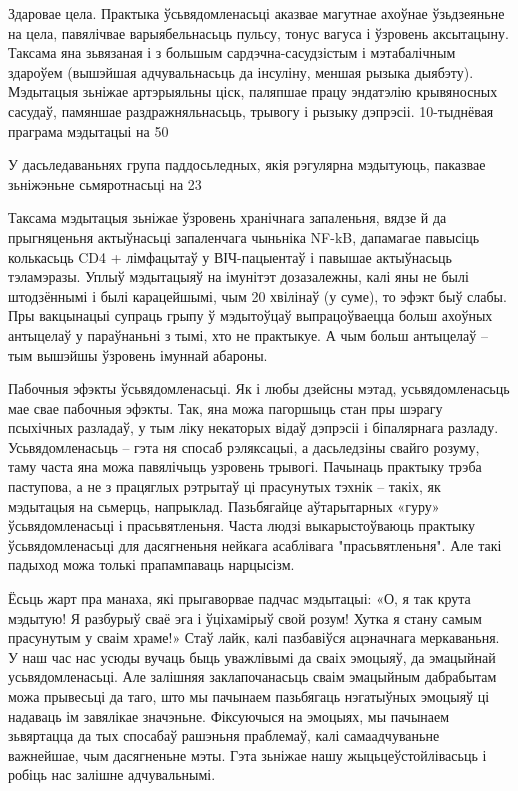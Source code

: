 Здаровае цела. Практыка ўсьвядомленасьці аказвае магутнае ахоўнае ўзьдзеяньне на цела, павялічвае варыябельнасьць пульсу, тонус вагуса і ўзровень аксытацыну. Таксама яна зьвязаная і з большым сардэчна-сасудзістым і мэтабалічным здароўем (вышэйшая адчувальнасьць да інсуліну, меншая рызыка дыябэту). Мэдытацыя зьніжае артэрыяльны ціск, паляпшае працу эндатэлію крывяносных сасудаў, памяншае раздражняльнасьць, трывогу і рызыку дэпрэсіі. 10-тыднёвая праграма мэдытацыі на 50%

У дасьледаваньнях група паддосьледных, якія рэгулярна мэдытуюць, паказвае зьніжэньне сьмяротнасьці на 23%

Таксама мэдытацыя зьніжае ўзровень хранічнага запаленьня, вядзе й да прыгняценьня актыўнасьці запаленчага чыньніка NF-kB, дапамагае павысіць колькасьць CD4 + лімфацытаў у ВІЧ-пацыентаў і павышае актыўнасьць тэламэразы. Уплыў мэдытацыяў на імунітэт дозазалежны, калі яны не былі штодзённымі і былі карацейшымі, чым 20 хвілінаў (у суме), то эфэкт быў слабы. Пры вакцынацыі супраць грыпу ў мэдытоўцаў выпрацоўваецца больш ахоўных антыцелаў у параўнаньні з тымі, хто не практыкуе. А чым больш антыцелаў – тым вышэйшы ўзровень імуннай абароны.

Пабочныя эфэкты ўсьвядомленасьці. Як і любы дзейсны мэтад, усьвядомленасьць мае свае пабочныя эфэкты. Так, яна можа пагоршыць стан пры шэрагу псыхічных разладаў, у тым ліку некаторых відаў дэпрэсіі і біпалярнага разладу. Усьвядомленасьць – гэта ня спосаб рэляксацыі, а дасьледзіны свайго розуму, таму часта яна можа павялічыць узровень трывогі. Пачынаць практыку трэба паступова, а не з працяглых рэтрытаў ці прасунутых тэхнік – такіх, як мэдытацыя на сьмерць, напрыклад. Пазьбягайце аўтарытарных «гуру» ўсьвядомленасьці і прасьвятленьня. Часта людзі выкарыстоўваюць практыку ўсьвядомленасьці для дасягненьня нейкага асаблівага "прасьвятленьня". Але такі падыход можа толькі прапампаваць нарцысізм.

Ёсьць жарт пра манаха, які прыгаворвае падчас мэдытацыі: «О, я так крута мэдытую! Я разбурыў сваё эга і ўціхамірыў свой розум! Хутка я стану самым прасунутым у сваім храме!» Стаў лайк, калі пазбавіўся ацэначнага меркаваньня. У наш час нас усюды вучаць быць уважлівымі да сваіх эмоцыяў, да эмацыйнай усьвядомленасьці. Але залішняя заклапочанасьць сваім эмацыйным дабрабытам можа прывесьці да таго, што мы пачынаем пазьбягаць нэгатыўных эмоцыяў ці надаваць ім завялікае значэньне. Фіксуючыся на эмоцыях, мы пачынаем зьвяртацца да тых спосабаў рашэньня праблемаў, калі самаадчуваньне важнейшае, чым дасягненьне мэты. Гэта зьніжае нашу жыцьцеўстойлівасьць і робіць нас залішне адчувальнымі.

